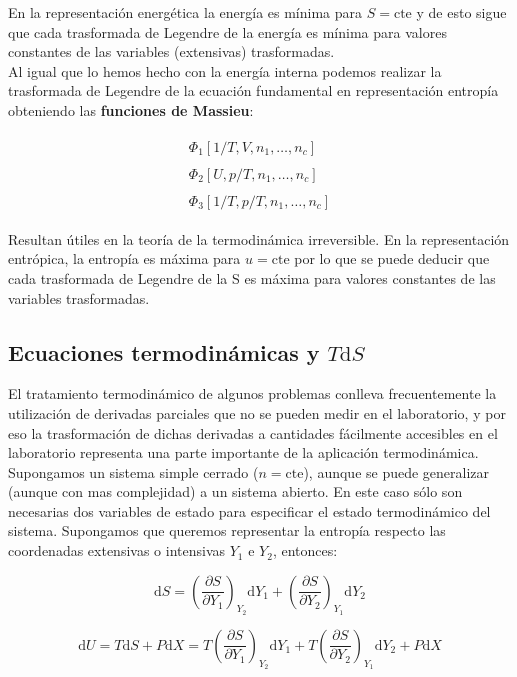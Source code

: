 \documentclass[12pt,a4paper]{article}
\newcommand{\D}{\mathrm{d}}
\newcommand{\cte}{\mathrm{cte}}
\newcommand{\parentesis}[1]{\left( #1 \right)}
\newcommand{\parciales}[2]{\frac{\partial #1}{\partial #2}}
\begin{document}
En la representación energética la energía es mínima para $S=\cte$ y de esto sigue que cada trasformada de Legendre de la energía es mínima para valores constantes de las variables (extensivas) trasformadas. \\

Al igual que lo hemos hecho con la energía interna podemos realizar la trasformada de Legendre de la ecuación fundamental en representación entropía obteniendo las \textbf{funciones de Massieu}:

\begin{gather}
\begin{array}{l}
\Phi_1 [1/T, V, n_1, \ldots, n_c ] \\ \\
\Phi_2 [U, p/T, n_1, \ldots, n_c ] \\ \\
\Phi_3 [1/T, p/T, n_1, \ldots, n_c ]
\end{array}
\end{gather}

Resultan útiles en la teoría de la termodinámica irreversible. En la representación entrópica, la entropía es máxima para $u=\cte$ por lo que se puede deducir que cada trasformada de Legendre de la S es máxima para valores constantes de las variables trasformadas.


\subsection{Ecuaciones termodinámicas y $T\D S$}

El tratamiento termodinámico de algunos problemas conlleva frecuentemente la utilización de derivadas parciales que no se pueden medir en el laboratorio, y por eso la trasformación de dichas derivadas a cantidades fácilmente accesibles en el laboratorio representa una parte importante de la aplicación termodinámica. Supongamos un sistema simple cerrado ($n=\cte$), aunque se puede generalizar (aunque con mas complejidad) a un sistema abierto. En este caso sólo son necesarias dos variables de estado para especificar el estado termodinámico del sistema. Supongamos que queremos representar la entropía respecto las coordenadas extensivas o intensivas $Y_1$ e $Y_2$, entonces:

\begin{equation}
\D S = \parentesis{\parciales{S}{Y_1}}_{Y_2} \D Y_1 + \parentesis{\parciales{S}{Y_2}}_{Y_1} \D Y_2
\end{equation}

\begin{equation}
\D U = T \D S +P \D X =T  \parentesis{\parciales{S}{Y_1}}_{Y_2} \D Y_1 + T \parentesis{\parciales{S}{Y_2}}_{Y_1} \D Y_2 + P \D X
\end{equation}
\end{document}
